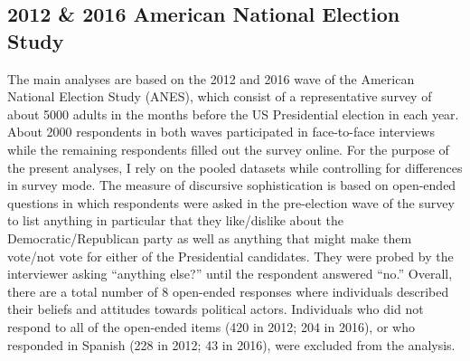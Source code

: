 \subsection*{2012 \& 2016 American National Election Study}
The main analyses are based on the 2012 and 2016 wave of the American National Election Study (ANES), which consist of a representative survey of about 5000 adults in the months before the US Presidential election in each year. About 2000 respondents in both waves participated in face-to-face interviews while the remaining respondents filled out the survey online. For the purpose of the present analyses, I rely on the pooled datasets while controlling for differences in survey mode. The measure of discursive sophistication is based on open-ended questions in which respondents were asked in the pre-election wave of the survey to list anything in particular that they like/dislike about the Democratic/Republican party as well as anything that might make them vote/not vote for either of the Presidential candidates. They were probed by the interviewer asking ``anything else?'' until the respondent answered ``no.'' Overall, there are a total number of 8 open-ended responses where individuals described their beliefs and attitudes towards political actors. Individuals who did not respond to all of the open-ended items (420 in 2012; 204 in 2016), or who responded in Spanish (228 in 2012; 43 in 2016), were excluded from the analysis.


